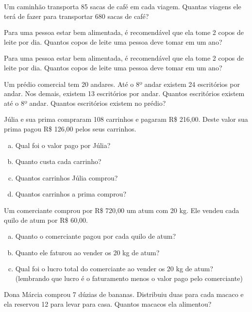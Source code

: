 	\item Um caminhão transporta 85 sacas de café em cada viagem. Quantas viagens ele terá de fazer para transportar 680 sacas de café?
	
	\item Para uma pessoa estar bem alimentada, é recomendável que ela tome 2 copos de leite por dia. Quantos copos de leite uma pessoa deve tomar em um ano?
	
	\item Para uma pessoa estar bem alimentada, é recomendável que ela tome 2 copos de leite por dia. Quantos copos de leite uma pessoa deve tomar em um ano?
	
	\item Um prédio comercial tem 20 andares. Até o 8º andar existem 24 escritórios por andar. Nos demais, existem 13 escritórios por andar. Quantos escritórios existem até o 8º andar. Quantos escritórios existem no prédio?
	
	\item Júlia e sua prima compraram 108 carrinhos e pagaram R\$ 216,00. Deste valor sua prima pagou R\$ 126,00 pelos seus carrinhos.
	\begin{multicols}{2}
	\begin{enumerate}[a)]
		\item Qual foi o valor pago por Júlia?
		\item Quanto custa cada carrinho?
		\item Quantos carrinhos Júlia comprou?
		\item  Quantos carrinhos a prima comprou?
	\end{enumerate}
	\end{multicols}
		
	\item Um comerciante comprou por R\$ 720,00 um atum com 20 kg. Ele vendeu cada quilo de atum por R\$ 60,00.
	\begin{enumerate}[a)]
		\item Quanto o comerciante pagou por cada quilo de atum?
		\item Quanto ele faturou ao vender os 20 kg de atum?
		\item Qual foi o lucro total do comerciante ao vender os 20 kg de atum? (lembrando que lucro é o faturamento menos o valor pago pelo comerciante)
	\end{enumerate}	

	\item Dona Márcia comprou 7 dúzias de bananas. Distribuiu duas para cada macaco e ela reservou 12 para levar para casa. Quantos macacos ela alimentou?

